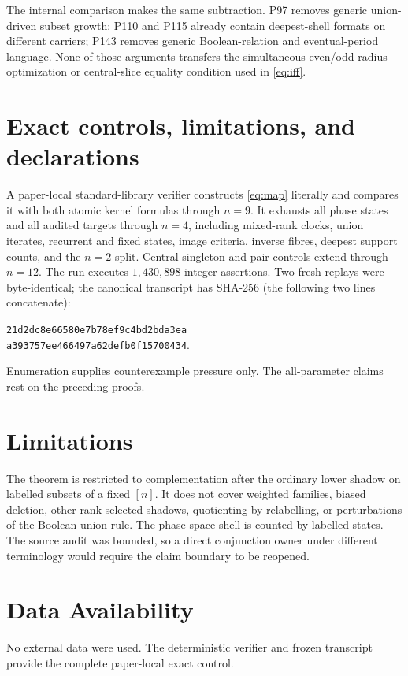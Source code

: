 \documentclass[a4paper,10pt]{amsart}
\begin{document}
The internal comparison makes the same subtraction.  P97 removes generic
union-driven subset growth; P110 and P115 already contain deepest-shell
formats on different carriers; P143 removes generic Boolean-relation and
eventual-period language.  None of those arguments transfers the simultaneous
even/odd radius optimization or central-slice equality condition used in
\eqref{eq:iff}.

\section{Exact controls, limitations, and declarations}

A paper-local standard-library verifier constructs \eqref{eq:map} literally
and compares it with both atomic kernel formulas through $n=9$.  It exhausts
all phase states and all audited targets through $n=4$, including mixed-rank
clocks, union iterates, recurrent and fixed states, image criteria, inverse
fibres, deepest support counts, and the $n=2$ split.  Central singleton and
pair controls extend through $n=12$.  The run executes $1{,}430{,}898$
integer assertions.  Two fresh replays were byte-identical; the canonical
transcript has SHA-256 (the following two lines concatenate):
\begin{center}
\small\texttt{21d2dc8e66580e7b78ef9c4bd2bda3ea}\\[-2pt]
\small\texttt{a393757ee466497a62defb0f15700434}.
\end{center}
Enumeration supplies counterexample pressure only.  The all-parameter claims
rest on the preceding proofs.

\section*{Limitations}
The theorem is restricted to complementation after the ordinary lower shadow
on labelled subsets of a fixed $[n]$.  It does not cover weighted families,
biased deletion, other rank-selected shadows, quotienting by relabelling, or
perturbations of the Boolean union rule.  The phase-space shell is counted by
labelled states.  The source audit was bounded, so a direct conjunction owner
under different terminology would require the claim boundary to be reopened.

\section*{Data Availability}
No external data were used.  The deterministic verifier and frozen transcript
provide the complete paper-local exact control.
\end{document}
